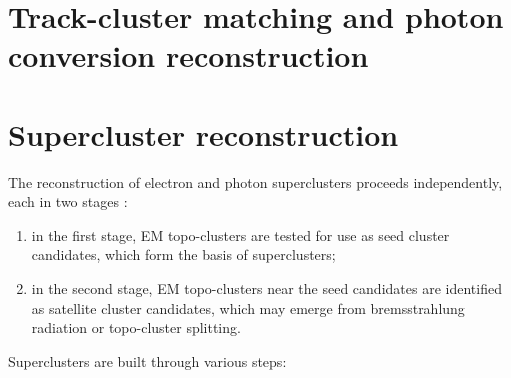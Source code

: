 \documentclass[a4paper, oneside]{book}
\begin{document}
		\section{Track-cluster matching and photon conversion reconstruction}

		\section{Supercluster reconstruction}
		The reconstruction of electron and photon superclusters proceeds independently, each in two stages \cite{El ph reco}:
		\begin{enumerate}
		\item in the first stage, EM topo-clusters are tested for use as seed cluster candidates, which form the basis of superclusters; 
		\item in the second stage, EM topo-clusters near the seed candidates are identified as satellite cluster candidates, which may emerge from bremsstrahlung radiation or topo-cluster splitting.
		\end{enumerate}
		Superclusters are built through various steps:
\end{document}
